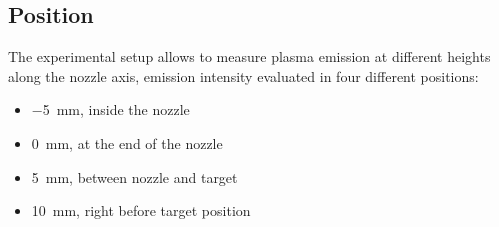 \subsection{Position}
The experimental setup allows to measure plasma emission at different heights along the nozzle axis, emission intensity evaluated in four different positions:
\begin{itemize}
 \item \SI{-5}{\milli\meter}, inside the nozzle
 \item \SI{0}{\milli\meter}, at the end of the nozzle
 \item \SI{5}{\milli\meter}, between nozzle and target
 \item \SI{10}{\milli\meter}, right before target position
\end{itemize}

